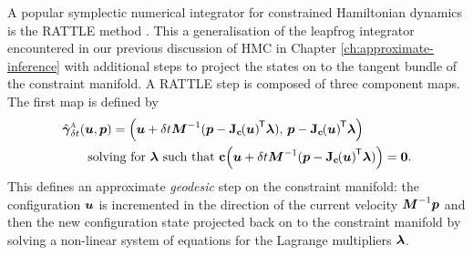 A popular symplectic numerical integrator for constrained Hamiltonian dynamics is the RATTLE method \citep{andersen1983rattle,leimkuhler1994symplectic}. This a generalisation of the leapfrog integrator encountered in our previous discussion of \ac{HMC} in Chapter \ref{ch:approximate-inference} with additional steps to project the states on to the tangent bundle of the constraint manifold. A RATTLE step is composed of three component maps. The first map is defined by
\begin{equation}\label{eq:rattle-step-a}
\begin{split}
  &\hat{\cflowmap}_{\delta t}^{\textsc{a}}(\vct{u},\vct{p}) =
  \lpa \vct{u} + \delta t \mtx{M}^{-1}(\vct{p}-\jacob{\vctfunc{c}}{\vct{u}}\tr\vct{\lambda}),\,\vct{p}-\jacob{\vctfunc{c}}{\vct{u}}\tr\vct{\lambda}\rpa\\
  &\qquad\textrm{solving for}~\vct{\lambda}~\textrm{such that}~\vctfunc{c}\lpa \vct{u} + \delta t \mtx{M}^{-1}(\vct{p}-\jacob{\vctfunc{c}}{\vct{u}}\tr\vct{\lambda})\rpa = \vct{0}.
\end{split}
\end{equation}
This defines an approximate \emph{geodesic} step on the constraint manifold: the configuration $\boldsymbol{u}$ is incremented in the direction of the current velocity $\boldsymbol{M}^{-1}\boldsymbol{p}$ and then the new configuration state projected back on to the constraint manifold by solving a non-linear system of equations for the Lagrange multipliers $\boldsymbol{\lambda}$. %

